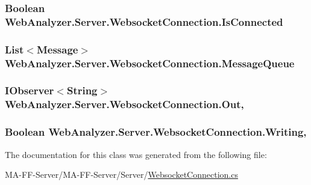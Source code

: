 \subsubsection[{Is\+Connected}]{\setlength{\rightskip}{0pt plus 5cm}Boolean Web\+Analyzer.\+Server.\+Websocket\+Connection.\+Is\+Connected\hspace{0.3cm}{\ttfamily [get]}}\label{class_web_analyzer_1_1_server_1_1_websocket_connection_a54d71b7e50589c027fff5441dea6ca54}
\hypertarget{class_web_analyzer_1_1_server_1_1_websocket_connection_a0351f67ba0d69e6d5701ef34395e0a59}{}
\subsubsection[{Message\+Queue}]{\setlength{\rightskip}{0pt plus 5cm}List$<${\bf Message}$>$ Web\+Analyzer.\+Server.\+Websocket\+Connection.\+Message\+Queue\hspace{0.3cm}{\ttfamily [get]}}\label{class_web_analyzer_1_1_server_1_1_websocket_connection_a0351f67ba0d69e6d5701ef34395e0a59}
\hypertarget{class_web_analyzer_1_1_server_1_1_websocket_connection_a1f0be7b1ff80c5b742204d0883157578}{}
\subsubsection[{Out}]{\setlength{\rightskip}{0pt plus 5cm}I\+Observer$<$String$>$ Web\+Analyzer.\+Server.\+Websocket\+Connection.\+Out\hspace{0.3cm}{\ttfamily [get]}, {\ttfamily [set]}}\label{class_web_analyzer_1_1_server_1_1_websocket_connection_a1f0be7b1ff80c5b742204d0883157578}
\hypertarget{class_web_analyzer_1_1_server_1_1_websocket_connection_a973edb4f0e5e1644f551bf132ae77183}{}
\subsubsection[{Writing}]{\setlength{\rightskip}{0pt plus 5cm}Boolean Web\+Analyzer.\+Server.\+Websocket\+Connection.\+Writing\hspace{0.3cm}{\ttfamily [get]}, {\ttfamily [set]}}\label{class_web_analyzer_1_1_server_1_1_websocket_connection_a973edb4f0e5e1644f551bf132ae77183}


The documentation for this class was generated from the following file\+:\begin{DoxyCompactItemize}
\item 
M\+A-\/\+F\+F-\/\+Server/\+M\+A-\/\+F\+F-\/\+Server/\+Server/\hyperlink{_websocket_connection_8cs}{Websocket\+Connection.\+cs}\end{DoxyCompactItemize}

